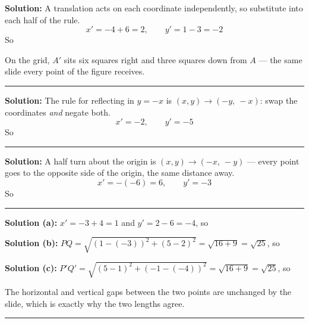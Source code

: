 \documentclass[12pt]{article}
\begin{document}




\textbf{Solution:} A translation acts on each coordinate independently, so substitute into each half of the rule.
\[ x' = -4 + 6 = 2, \qquad y' = 1 - 3 = -2 \]
So 

On the grid, $A'$ sits six squares right and three squares down from $A$ --- the same slide every point of the figure receives.

\vspace{0.2cm}\noindent\rule{\linewidth}{0.2pt}


\textbf{Solution:} The rule for reflecting in $y = -x$ is $(x, y) \to (-y,\ -x)$: swap the coordinates \emph{and} negate both.
\[ x' = -2, \qquad y' = -5 \]
So 

\vspace{0.2cm}\noindent\rule{\linewidth}{0.2pt}


\textbf{Solution:} A half turn about the origin is $(x, y) \to (-x,\ -y)$ --- every point goes to the opposite side of the origin, the same distance away.
\[ x' = -(-6) = 6, \qquad y' = -3 \]
So 

\vspace{0.2cm}\noindent\rule{\linewidth}{0.2pt}


\textbf{Solution (a):} $x' = -3 + 4 = 1$ and $y' = 2 - 6 = -4$, so 

\textbf{Solution (b):} $PQ = \sqrt{(1-(-3))^2 + (5-2)^2} = \sqrt{16 + 9} = \sqrt{25}$, so 

\textbf{Solution (c):} $P'Q' = \sqrt{(5-1)^2 + (-1-(-4))^2} = \sqrt{16 + 9} = \sqrt{25}$, so 

The horizontal and vertical gaps between the two points are unchanged by the slide, which is exactly why the two lengths agree.

\vspace{0.2cm}\noindent\rule{\linewidth}{0.2pt}
\end{document}
